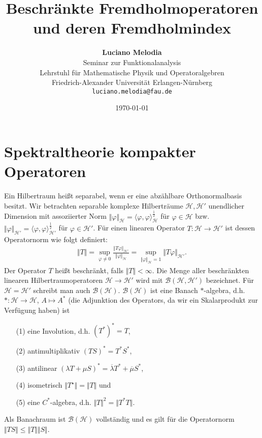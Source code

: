 \documentclass[11pt, hidelinks]{article}
\title{\textbf{Beschränkte Fremdholmoperatoren und deren Fremdholmindex}}
\author{
\textbf{Luciano Melodia} \\
Seminar zur Funktionalanalysis \\
Lehrstuhl für Mathematische Physik und Operatoralgebren \\
Friedrich-Alexander Universität Erlangen-Nürnberg \\
\texttt{luciano.melodia@fau.de}}
\date{\today}
\newcommand{\h}{\mathcal{H}}
\newcommand{\B}{\mathcal{B}}
\numberwithin{conj}{section}
\begin{document}
\hypersetup{bookmarksnumbered=true}
\maketitle

\begin{Large}
\tableofcontents
\end{Large}

\onehalfspacing
\section{Spektraltheorie kompakter Operatoren}
Ein Hilbertraum heißt separabel, wenn er eine abzählbare Orthonormalbasis besitzt. Wir betrachten separable komplexe Hilberträume $\h, \h'$ unendlicher Dimension mit assoziierter Norm $\Vert \varphi \Vert_{\h} = \langle \varphi, \varphi \rangle^{\frac{1}{2}}_{\h}$ für $\varphi \in \h$ bzw. $\Vert \varphi \Vert_{\h'} = \langle \varphi, \varphi \rangle^{\frac{1}{2}}_{\h'}$ für $\varphi \in \h'$. Für einen linearen Operator $T: \h \rightarrow \h'$ ist dessen Operatornorm wie folgt definiert:
\begin{align}
    \Vert T \Vert = \sup_{\varphi \neq 0} \frac{\Vert T\varphi \Vert_{\h'}}{\Vert\varphi\Vert_\h} = \sup_{\Vert\varphi\Vert_\h = 1} \Vert T\varphi\Vert_{\h'}.
\end{align}
Der Operator $T$ heißt beschränkt, falls $\Vert T \Vert < \infty$. Die Menge aller beschränkten linearen Hilbertraumoperatoren $\h \to \h'$ wird mit $\B(\h,\h')$ bezeichnet. Für $\h = \h'$ schreibt man auch $\B(\h)$. $\B(\h)$ ist eine Banach $\ast$-algebra, d.h. $\ast: \h \to \h$, $A \mapsto A^\ast$ (die Adjunktion des Operators, da wir ein Skalarprodukt zur Verfügung haben) ist 
\begin{enumerate}
    \item[(1)] eine Involution, d.h. $(T^\ast)^\ast = T$,
    \item[(2)] antimultiplikativ $(TS)^\ast = T^\ast S^\ast$,
    \item[(3)] antilinear $(\lambda T + \mu S)^\ast = \overline{\lambda} T^\ast + \overline{\mu} S^\ast$, 
    \item[(4)] isometrisch $\Vert T^\star \Vert = \Vert T \Vert$ und
    \item[(5)] eine $C^\ast$-algebra, d.h. $\Vert T \Vert^2 = \Vert T^\ast T \Vert$.
\end{enumerate}
Als Banachraum ist $\B(\h)$ vollständig und es gilt für die Operatornorm $\Vert TS  \Vert \leq \Vert T \Vert \Vert S \Vert$.
\end{document}
